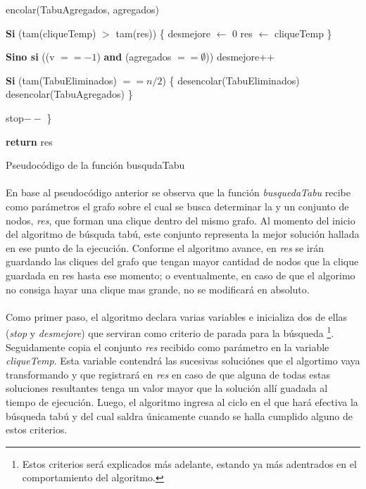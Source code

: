 \begin{algorithm}[H]
	\BlankLine \BlankLine		
	\tab encolar(TabuAgregados, agregados)												
	
	\BlankLine \BlankLine
	\tab \textbf{Si} (tam(cliqueTemp) $>$ tam(res)) \{ 									
	\tab \tab desmejore $\leftarrow$ 0													
	\tab \tab res $\leftarrow$ cliqueTemp												
	\tab \}

	\BlankLine \BlankLine		
	\tab \textbf{Sino si} ((v $== -1$) \textbf{and} (agregados $== \emptyset$)) 	
	\tab \tab desmejore++																
	
	\BlankLine \BlankLine
	\tab \textbf{Si} (tam(TabuEliminados) $== n/2$) \{									
	\tab \tab desencolar(TabuEliminados)												
	\tab \tab desencolar(TabuAgregados)												
	\tab \}	

	\BlankLine \BlankLine
	\tab stop$--$ 																			
	\}
	
	\BlankLine \BlankLine		
	\textbf{return} res																	
\caption{Pseudocódigo de la función busqudaTabu} 
\normalsize
\end{algorithm}

\paragraph{}
En base al pseudocódigo anterior se observa que la función \textit{busquedaTabu} recibe como parámetros el grafo sobre el cual se busca determinar la \mc y un conjunto de nodos, \textit{res}, que forman una clique dentro del mismo grafo. Al momento del inicio del algoritmo de búsquda tabú, este conjunto representa la mejor solución hallada en ese punto de la ejecución. Conforme el algoritmo avance, en \textit{res} se irán guardando las cliques del grafo que tengan mayor cantidad de nodos que la clique guardada en res hasta ese momento; o eventualmente, en caso de que el algorimo no consiga hayar una clique mas grande, no se modificará en absoluto.

\paragraph{}
Como primer paso, el algoritmo declara varias variables e inicializa dos de ellas (\textit{stop} y \textit{desmejore}) que serviran como criterio de parada para la búsqueda \footnote{Estos criterios será explicados más adelante, estando ya más adentrados en el comportamiento del algoritmo.}. Seguidamente copia el conjunto \textit{res} recibido como parámetro en la variable \textit{cliqueTemp}. Esta variable contendrá las sucesivas soluciónes que el algortimo vaya transformando y que registrará en \textit{res} en caso de que alguna de todas estas soluciones resultantes tenga un valor mayor que la solución allí guadada al tiempo de ejecución. Luego, el algoritmo ingresa al ciclo en el que hará efectiva la búsqueda tabú y del cual saldra únicamente cuando se halla cumplido alguno de estos criterios.  

